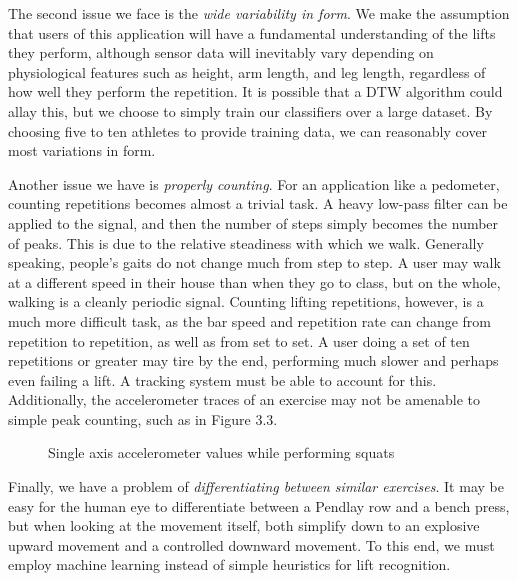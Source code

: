The second issue we face is the \textit{wide variability in form}. We make the assumption that users of this application will have a fundamental understanding of the lifts they perform, although sensor data will inevitably vary depending on physiological features such as height, arm length, and leg length, regardless of how well they perform the repetition. It is possible that a DTW algorithm could allay this, but we choose to simply train our classifiers over a large dataset. By choosing five to ten athletes to provide training data, we can reasonably cover most variations in form. 

Another issue we have is \textit{properly counting}. For an application like a pedometer, counting repetitions becomes almost a trivial task. A heavy low-pass filter can be applied to the signal, and then the number of steps simply becomes the number of peaks. This is due to the relative steadiness with which we walk. Generally speaking, people's gaits do not change much from step to step. A user may walk at a different speed in their house than when they go to class, but on the whole, walking is a cleanly periodic signal. Counting lifting repetitions, however, is a much more difficult task, as the bar speed and repetition rate can change from repetition to repetition, as well as from set to set. A user doing a set of ten repetitions or greater may tire by the end, performing much slower and perhaps even failing a lift. A tracking system must be able to account for this. Additionally, the accelerometer traces of an exercise may not be amenable to simple peak counting, such as in Figure 3.3.

\begin{figure}
    \centering
    \caption{Single axis accelerometer values while performing squats}
\end{figure}

Finally, we have a problem of \textit{differentiating between similar exercises}. It may be easy for the human eye to differentiate between a Pendlay row and a bench press, but when looking at the movement itself, both simplify down to an explosive upward movement and a controlled downward movement. To this end, we must employ machine learning instead of simple heuristics for lift recognition. 



